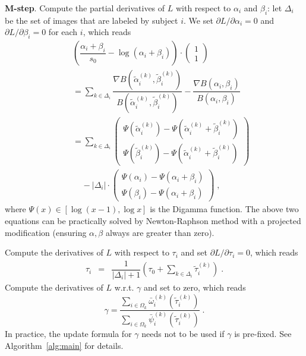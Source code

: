\documentclass[10pt,journal,letterpaper,compsoc,twoside]{IEEEtran}
\newcommand{\tmtextbf}[1]{{\bfseries{#1}}}
\begin{document}
\tmtextbf{M-step}. Compute the partial derivatives of $L$ with respect to $\alpha_{i}$
and $\beta_{i}$: let $\Delta_i$ be the set of images that are labeled by subject $i$.
We set $\partial L / \partial \alpha_i =0 $ and $\partial L / \partial \beta_i = 0$ for each $i$, which reads
\begin{eqnarray}
  && \left(\dfrac{\alpha_i + \beta_i}{s_0} - \log (\alpha_i + \beta_i)\right) \cdot
  \left(\begin{array}{c}
     1\\
     1
  \end{array}\right) \nonumber \\  
   && = \sum_{k \in \Delta_{i}} \dfrac{\nabla B (
  \tilde{\alpha}_{i}^{( k )} , \tilde{\beta}_{i}^{( k )} )}{B (
  \tilde{\alpha}_{i}^{( k )} , \tilde{\beta}_{i}^{( k )} )} - \dfrac{\nabla B
  ( \alpha_{i} , \beta_{i} )}{B ( \alpha_{i} , \beta_{i} )} \nonumber\\
  && = \sum_{k \in \Delta_{i}} \left(\begin{array}{c}
    \Psi ( \tilde{\alpha}_{i}^{( k )} ) - \Psi ( \tilde{\alpha}_{i}^{( k )} +
    \tilde{\beta}_{i}^{( k )} )\\
    \Psi ( \tilde{\beta}_{i}^{( k )} ) - \Psi ( \tilde{\alpha}_{i}^{( k )} +
    \tilde{\beta}_{i}^{( k )} ) 
  \end{array}\right)  \nonumber \\ 
   && \;\;\;\; - | \Delta_{i} | \cdot \left(\begin{array}{c}
    \Psi ( \alpha_{i} ) - \Psi ( \alpha_{i} + \beta_{i} ) \\
    \Psi ( \beta_{i} ) - \Psi ( \alpha_{i} + \beta_{i} )
  \end{array}\right)\;, \label{eq:alphabeta}
\end{eqnarray}
where $\Psi ( x ) \in [ \log ( x-1 ) , \log  x ]$ is the Digamma function. 
The above two equations can be practically solved by Newton-Raphson method 
with a projected modification 
(ensuring $\alpha,\beta$ always are greater than zero).


Compute the derivatives of $L$ with respect to $\tau_{i}$ and set $\partial L / \partial \tau_i = 0$, which reads
\begin{eqnarray}
  \tau_{i} & = & \dfrac{1}{| \Delta_{i} |+1} \left(\tau_0 + \sum_{k \in \Delta_{i}}\tilde{\tau}_{i}^{( k
  )}\right)\;. \label{eq:tau} 
\end{eqnarray}
Compute the derivatives of $L$ w.r.t. $\gamma$ and set to zero, which reads
\begin{equation}
  \gamma = \dfrac{\sum_{i \in \Omega_{k}} \bar{\omega}_{i}^{( k )} ( \tilde{\tau}_{i}^{(
  k )} )}{\sum_{i \in \Omega_{k}} \bar{\psi}_{i}^{( k )} ( \tilde{\tau}_{i}^{( k )} )}\;.
  \label{eq:gamma}
\end{equation}
In practice, the update formula for $\gamma$ needs not to be used if $\gamma$ is pre-fixed. 
See Algorithm~\ref{alg:main} for details. 
\end{document}
